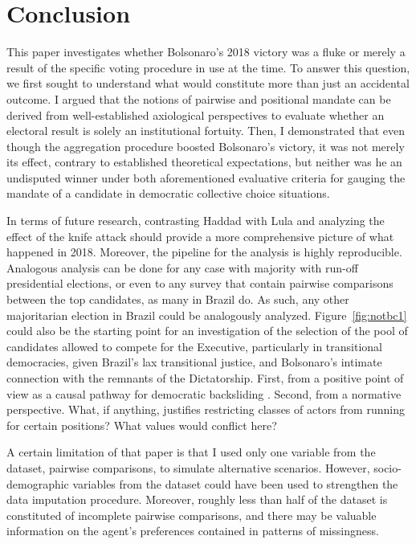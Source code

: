 \documentclass[hidelinks,11pt]{article} \usepackage[utf8]{inputenc}
\begin{document}
\section{Conclusion}

This paper investigates whether Bolsonaro's 2018 victory was a fluke or merely a
result of the specific voting procedure in use at the time. To answer this
question, we first sought to understand what would constitute more than just an
accidental outcome. I argued that the notions of pairwise and positional mandate
can be derived from well-established axiological perspectives to evaluate
whether an electoral result is solely an institutional fortuity. Then, I
demonstrated that even though the aggregation procedure boosted Bolsonaro's
victory, it was not merely its effect, contrary to established theoretical
expectations, but neither was he an undisputed winner under both aforementioned
evaluative criteria for gauging the mandate of a candidate in democratic
collective choice situations.

In terms of future research, contrasting Haddad with Lula and analyzing the
effect of the knife attack should provide a more comprehensive picture of what
happened in 2018. Moreover, the pipeline for the analysis is highly
reproducible. Analogous analysis can be done for any case with majority with
run-off presidential elections, or even to any survey that contain pairwise
comparisons between the top candidates, as many in Brazil do. As such, any other
majoritarian election in Brazil could be analogously analyzed. Figure~\ref{fig:notbc1} could
also be the starting point for an investigation of the selection of the pool of
candidates allowed to compete for the Executive, particularly in transitional
democracies, given Brazil's lax transitional justice, and Bolsonaro's intimate
connection with the remnants of the Dictatorship. First, from a positive point
of view as a causal pathway for democratic backsliding
\parencite{svolik2008authoritarian, nalepa2022after}. Second, from a normative
perspective. What, if anything, justifies restricting classes of actors from
running for certain positions? What values would conflict here?

A certain limitation of that paper is that I used only one variable from
the dataset, pairwise comparisons, to simulate alternative scenarios. However,
socio-demographic variables from the dataset could have been used to strengthen
the data imputation procedure. Moreover, roughly less than half of the dataset
is constituted of incomplete pairwise comparisons, and there may be valuable
information on the agent's preferences contained in patterns of missingness.
\end{document}
